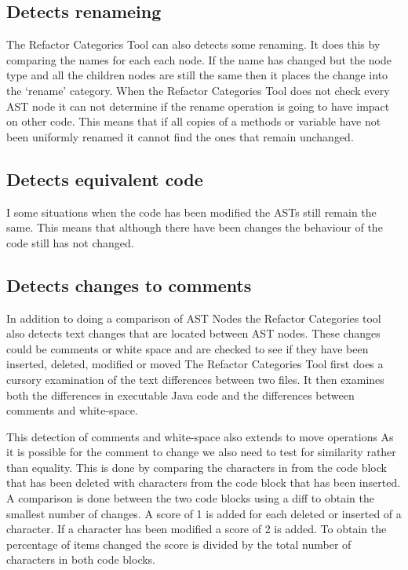 \subsection{Detects renameing}
The Refactor Categories Tool can also detects some renaming. 
It does this by comparing the names for each each node.
If the name has changed but the node type and all the children nodes are still the same then it places the change into the `rename' category.
When the Refactor Categories Tool does not check every AST node it can not determine if the rename operation is going to have impact on other code.
This means that if all copies of a methods or variable have not been uniformly renamed it cannot find the ones that remain unchanged.

\subsection{Detects equivalent code}
I some situations when the code has been modified the ASTs still remain the same.  
This means that although there have been changes the behaviour of the code still has not changed.

\subsection{Detects changes to comments} 
In addition to doing a comparison of AST Nodes the Refactor Categories tool also detects text changes that are located between AST nodes.
These changes could be comments or white space and are checked to see if they have been inserted, deleted, modified or moved
The Refactor Categories Tool first does a cursory examination of the text differences between two files.
It then examines both the differences in executable Java code and the differences between comments and white-space. 

This detection of comments and white-space also extends to move operations 
As it is possible for the comment to change we also need to test for similarity rather than equality.  
This is done by comparing the characters in from the code block that has been deleted with characters from the code block that has been inserted.  
A comparison is done between the two code blocks using a diff to obtain the smallest number of changes. 
A score of 1 is added for each deleted or inserted of a character.
If a character has been modified a score of 2 is added. 
To obtain the percentage of items changed the score is divided by the total number of characters in both code blocks.

